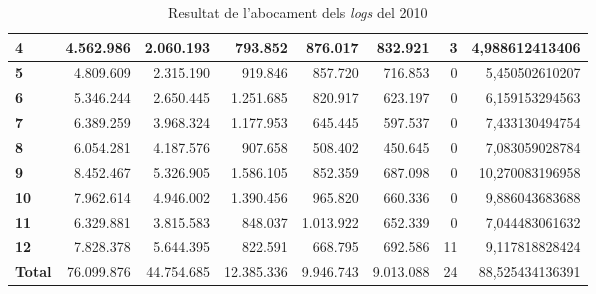 \begin{table}[h!]
\begin{adjustbox}{width=1.5\textwidth, center}
\begin{tabular}{|l|r|r|r|r|r|r|r|}
            \textbf{4}     & 4.562.986  & 2.060.193  & 793.852    & 876.017   & 832.921   & 3  & 4,988612413406  \\
            \midrule
            \textbf{5}     & 4.809.609  & 2.315.190  & 919.846    & 857.720   & 716.853   & 0  & 5,450502610207  \\
            \textbf{6}     & 5.346.244  & 2.650.445  & 1.251.685  & 820.917   & 623.197   & 0  & 6,159153294563  \\
            \textbf{7}     & 6.389.259  & 3.968.324  & 1.177.953  & 645.445   & 597.537   & 0  & 7,433130494754  \\
            \textbf{8}     & 6.054.281  & 4.187.576  & 907.658    & 508.402   & 450.645   & 0  & 7,083059028784  \\
            \midrule
            \textbf{9}     & 8.452.467  & 5.326.905  & 1.586.105  & 852.359   & 687.098   & 0  & 10,270083196958 \\
            \textbf{10}    & 7.962.614  & 4.946.002  & 1.390.456  & 965.820   & 660.336   & 0  & 9,886043683688  \\
            \textbf{11}    & 6.329.881  & 3.815.583  & 848.037    & 1.013.922 & 652.339   & 0  & 7,044483061632  \\
            \textbf{12}    & 7.828.378  & 5.644.395  & 822.591    & 668.795   & 692.586   & 11 & 9,117818828424  \\
            \midrule
            \textbf{Total} & 76.099.876 & 44.754.685 & 12.385.336 & 9.946.743 & 9.013.088 & 24 & 88,525434136391 \\
            \bottomrule
        \end{tabular}
    \end{adjustbox}
    \caption{Resultat de l'abocament dels \textit{logs} del 2010}
    \label{tab:logs-table-2010}
\end{table}
